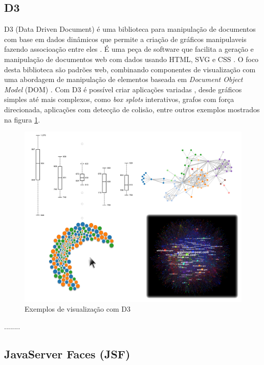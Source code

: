 	
\subsection{D3}

D3 (Data Driven Document) é uma biblioteca para manipulação de documentos com base em dados dinâmicos que permite a criação de gráficos manipulaveis fazendo associoação entre eles \cite{d3site} \cite{zhu2013data}.  É  uma peça de software que facilita a geração e manipulação de documentos web com dados usando HTML, SVG e CSS \cite{murray2013interactive}. O foco desta biblioteca são padrões web, combinando componentes de visualização com uma abordagem de manipulação de elementos baseada em \textit{Document Object Model} (DOM) \cite{d3site} . Com D3 é possível criar aplicações variadas \cite{d3site}, desde gráficos simples até mais complexos, como  \textit{box splots} interativos, grafos com força direcionada, aplicações com detecção de colisão, entre outros exemplos mostrados na figura \ref{fig:d3exemplos}. 

\begin{figure}[!ht]
	\centering
	\includegraphics[width=1\columnwidth]{images/D3jsexemplos.png}
	\caption{Exemplos de visualização com D3  \cite{d3site}}
	\label{fig:d3exemplos}
\end{figure}

........
%

\subsection{JavaServer Faces (JSF)}

